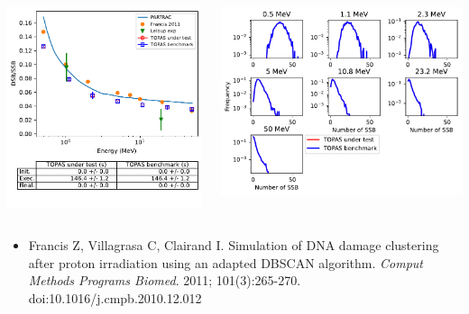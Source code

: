 \documentclass[aspectratio=1610]{beamer}
\begin{document}
\begin{frame}{\secname}
 \begin{columns}
  \begin{column}{0.4\linewidth}
   \includegraphics[width=1.1\textwidth]{./DBSCAN/DBSCAN2_g4em-dna_opt2}
  \end{column}
  \begin{column}{0.6\linewidth} 
   \includegraphics[width=\textwidth]{./DBSCAN/DBSCAN1_g4em-dna_opt2}
  \end{column}
 \end{columns}
\begin{itemize}
\item \tiny{Francis Z, Villagrasa C, Clairand I. Simulation of DNA damage clustering after proton irradiation using an adapted DBSCAN algorithm. \textit{Comput Methods Programs Biomed}. 2011; 101(3):265-270. doi:10.1016/j.cmpb.2010.12.012}
\end{itemize}
\end{frame}
\end{document}
